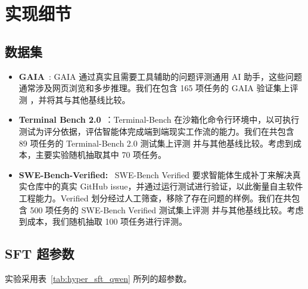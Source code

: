 
\clearpage
\onecolumn
\appendix
\label{sec:appendix}

\section{实现细节}
\label{app:A}

\subsection{数据集}
\label{app:dataset}
\begin{itemize}
    \item \textbf{GAIA}~\cite{mialon2023gaia}: 
    GAIA 通过真实且需要工具辅助的问题评测通用 AI 助手，这些问题通常涉及网页浏览和多步推理。我们在包含 165 项任务的 GAIA 验证集上评测 \our{}，并将其与其他基线比较。

    \item \textbf{Terminal Bench 2.0}~\cite{tbench_2025}：Terminal-Bench 在沙箱化命令行环境中，以可执行测试为评分依据，评估智能体完成端到端现实工作流的能力。我们在共包含 89 项任务的 Terminal-Bench 2.0 测试集上评测 \our{} 并与其他基线比较。考虑到成本，主要实验随机抽取其中 70 项任务。

    \item \textbf{SWE-Bench-Verified:}~\cite{jimenez2023swe} 
    SWE-Bench Verified 要求智能体生成补丁来解决真实仓库中的真实 GitHub issue，并通过运行测试进行验证，以此衡量自主软件工程能力。Verified 划分经过人工筛查，移除了存在问题的样例。我们在共包含 500 项任务的 SWE-Bench Verified 测试集上评测 \our{} 并与其他基线比较。考虑到成本，我们随机抽取 100 项任务进行评测。
\end{itemize}

\subsection{SFT 超参数}
\label{app:sft_hyper}
实验采用表~\ref{tab:hyper_sft_qwen} 所列的超参数。

